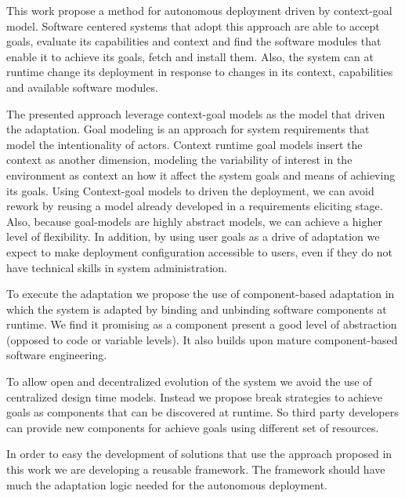 This work propose a method for autonomous deployment driven by context-goal model. Software centered systems that adopt this approach are able to accept goals, evaluate its capabilities and context and find the software modules that enable it to achieve its goals, fetch and install them. Also, the system can at runtime change its deployment in response to changes in its context, capabilities and available software modules.


The presented approach leverage context-goal models as the model that driven the adaptation. Goal modeling is an approach for system requirements that model the intentionality of actors.
Context runtime goal models insert the context as another dimension, modeling the variability of interest in the environment as context an how it affect the system goals and means of achieving its goals.
Using Context-goal models to driven the deployment, we can avoid rework by reusing a model already developed in a requirements eliciting stage. Also, because goal-models are highly abstract models, we can achieve a higher level of flexibility. In addition, by using user goals as a drive of adaptation we expect to make deployment configuration accessible to users, even if they do not have technical skills in system administration.

To execute the adaptation we propose the use of component-based adaptation in which the system is adapted by binding and unbinding software components at runtime. We find it promising as a component present a good level of abstraction (opposed to code or variable levels). It also builds upon mature component-based software engineering.

To allow open and decentralized evolution of the system we avoid the use of centralized design time models. Instead we propose break strategies to achieve goals as components that can be discovered at runtime. So third party developers can provide new components for achieve goals using different set of resources.

In order to easy the development of solutions that use the approach proposed in this work we are developing a reusable framework. The framework should have much the adaptation logic needed for the autonomous deployment.

